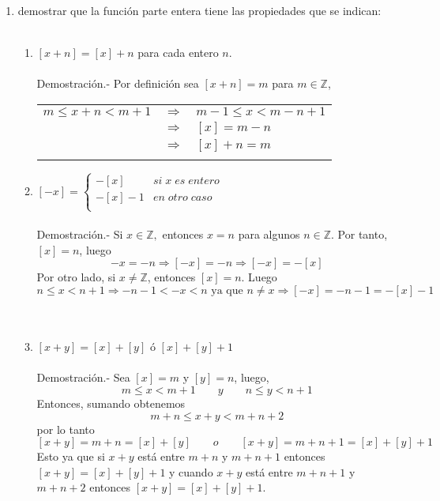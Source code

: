 \begin{enumerate}[ \bfseries 1.]
\begin{enumerate}[\bfseries (a)]
	\end{enumerate}
	
	\item demostrar que la función parte entera  tiene las propiedades que se indican:\\\\

	\begin{enumerate}[\bfseries (a)]

	    \item $[x+n] = [x] + n$ para cada entero $n$.\\\\
		Demostración.-\; Por definición sea $[x+n]=m$ para $m\in \mathbb{Z}$,
		\begin{center}
		    \begin{tabular}{rcl}
			$m \leq x+n < m+1$ & $\Longrightarrow$ & $m-1 \leq x < m-n+1$\\
			 & $\Longrightarrow$ & $[x]=m-n$\\
			 & $\Longrightarrow$ & $[x]+n=m$\\\\
		    \end{tabular}
		\end{center}

	    \item $[-x] = \left\{ 
		    \begin{array}{ll} 
			-[x] & si \; x \; es \; entero \\ 
			-[x] - 1 & en \; otro \; caso\\
		    \end{array} 
		\right.$ \\\\
		Demostración.-\; Si $x \in \mathbb{Z},$ entonces $x=n$ para algunos $n \in \mathbb{Z}$. Por tanto, $[x]=n$, luego $$-x=-n \Longrightarrow [-x]=-n \Longrightarrow [-x] = -[x]$$
		Por otro lado, si $x \neq \mathbb{Z}$, entonces $[x]=n$. Luego $$n\leq x < n+1 \Longrightarrow -n-1 < -x < n \mbox{ ya que } n\neq x \Longrightarrow [-x] = -n -1 = -[x] - 1$$\\\\
 
	    \item $[x+y] = [x] + [y]$ ó $[x] + [y] + 1$\\\\
		Demostración.-\; Sea $[x]=m$ y $[y]=n$, luego,
		$$m\leq x < m+1 \qquad y \qquad n\leq y < n+1$$ Entonces, sumando obtenemos $$m+n \leq x+y < m+n+2$$  por lo tanto $$[x+y]=m+n=[x]+[y] \qquad o \qquad [x+y] = m+n+1=[x]+[y]+1$$ Esto ya que si $x+y$ está entre $m+n$ y $m+n+1$ entonces $[x+y]=[x] + [y] + 1$ y cuando $x+y$ está entre $m+n+1$ y $m+n+2$ entonces $[x+y] = [x] + [y] + 1.$\\\\ 


\end{enumerate}
\end{enumerate}
